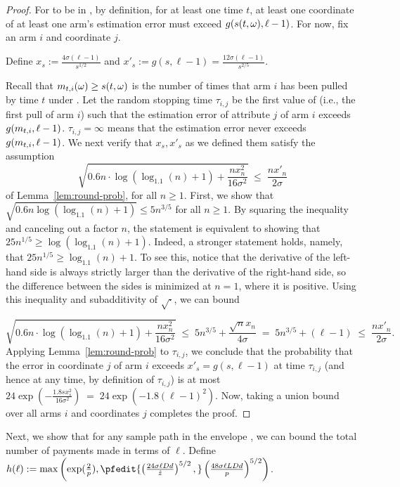 \begin{proof}
For \SP to be in \Env{\ell}, by definition,
for at least one time $t$,
at least one coordinate of at least one arm's estimation error must
exceed $g(s(t,\omega),\ell-1)$.
For now, fix an arm $i$ and coordinate $j$.

Define $x_s := \frac{4 \sigma (\ell-1)}{s^{1/2}}$ and
$x'_s := g(s, \ell-1) = \frac{12 \sigma (\ell-1)}{s^{2/5}}$.

Recall that $m_{t,i}(\omega) \geq s(t,\omega)$ is the number of times
that arm $i$ has been pulled by time $t$ under \SP.
Let the random stopping time $\tau_{i,j}$ be the first value of
 (i.e., the first pull of arm $i$) such that 
the estimation error of attribute $j$ of arm $i$ exceeds
$g(m_{t,i}, \ell-1)$.
$\tau_{i,j} = \infty$ means that the estimation error never exceeds 
$g(m_{t,i}, \ell-1)$.
We next verify that $x_s, x'_s$ as we defined them satisfy the 
assumption 
\[
  \sqrt{0.6 n \cdot \log (\log_{1.1}(n) + 1) + \frac{n x_n^2}{16 \sigma^2}}
  \; \leq \; \frac{n x'_n}{2 \sigma}
\]
of Lemma~\ref{lem:round-prob}, for all $n \geq 1$.
First, we show that
$\sqrt{0.6n \log(\log_{1.1}(n)+1)} \leq 5 n^{3/5}$
for all $n \geq 1$.
By squaring the inequality and canceling out a factor $n$,
the statement is equivalent to showing that
$25 n^{1/5} \geq \log(\log_{1.1}(n)+1)$.
Indeed, a stronger statement holds, namely, that
$25 n^{1/5} \geq \log_{1.1}(n)+1$.  
To see this, notice that the derivative of the left-hand side is
always strictly larger than the derivative of the right-hand side,
so the difference between the sides is minimized at $n=1$,
where it is positive. 
Using this inequality and subadditivity of $\sqrt{\cdot}$, we can bound

\[
  \sqrt{0.6 n \cdot \log (\log_{1.1}(n) + 1) + \frac{n x_n^2}{16 \sigma^2}}
\; \leq \;
  5 n^{3/5} + \frac{\sqrt{n} x_n}{4 \sigma}
\; = \; 
  5 n^{3/5} + (\ell-1)
  \; \leq \; \frac{n x'_n}{2 \sigma}.
\]
Applying Lemma~\ref{lem:round-prob} to $\tau_{i,j}$,
we conclude that the probability that the error in coordinate $j$ of
arm $i$ exceeds $x'_s = g(s,\ell-1)$ at time $\tau_{i,j}$
(and hence at any time, by definition of $\tau_{i,j}$)
is at most
$24 \exp\left(-\frac{1.8 s x_s^2}{16 \sigma^2} \right)
\; = \; 24 \exp(-1.8 (\ell-1)^2)$.
Now, taking a union bound over all arms $i$ and
coordinates $j$ completes the proof.
\end{proof}

Next, we show that for any sample path \SP in the envelope \Env{\ell},
we can bound the total number of payments made in terms of $\ell$.
Define $h(\ell) := \max \left( \exp(\frac{2}{\MinProb}),
\pfedit{
\left( \frac{24 \sigma \ell \Diam d}{\TieCutoff} \right)^{5/2},
}
\left( \frac{48 \sigma \ell \TieDensity \Diam d}{\MinProb} \right)^{5/2}
\right)$.

